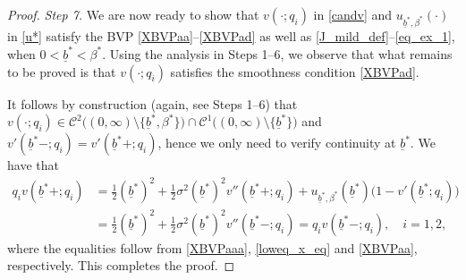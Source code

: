\documentclass[10pt,a4paper]{amsart}
\def\ub{\underline{b}}
\begin{document}
\begin{proof}
\vspace{1mm}
{\it Step 7.} We are now ready to show that $v(\cdot;q_i)$ in 
\eqref{candv} and $u_{\ub^*,\beta^*}(\cdot)$ in \eqref{u*} satisfy the BVP \eqref{XBVPaa}--\eqref{XBVPad} as well as \eqref{J_mild_def}--\eqref{eq_ex_1}, when $0 < \ub^* < \beta^*$. 
Using the analysis in Steps 1--6, we observe that what remains to be proved is that $v(\cdot;q_i)$ satisfies the smoothness condition \eqref{XBVPad}. 


It follows by construction (again, see Steps 1--6) that $v(\cdot;q_i)\in \mathcal{C}^2\big( (0,\infty) \setminus \{\ub^*, \beta^*\} \big) \cap \mathcal{C}^1\big( (0,\infty) \setminus \{\ub^*\} \big)$ and $v'(\ub^*-;q_i) = v'(\ub^*+;q_i)$, hence we only need to verify continuity at $\ub^*$. We have that 
\begin{align*}
q_i v(\ub^*+;q_i) 
&= \tfrac1{2} (\ub^*)^2 + \tfrac1{2} \sigma^2 (\ub^*)^2 v''(\ub^*+;q_i) + u_{\ub^*,\beta^*}(\ub^*) \big(1 - v'(\ub^*;q_i)\big) \\
&= \tfrac1{2} (\ub^*)^2 + \tfrac1{2} \sigma^2 (\ub^*)^2 v''(\ub^*-;q_i)
= q_i v(\ub^*-;q_i) , \quad i=1,2,
\end{align*}
where the equalities follow from \eqref{XBVPaaa}, \eqref{loweq_x_eq} and \eqref{XBVPaa}, respectively. This completes the proof.
\end{proof}
\end{document}
